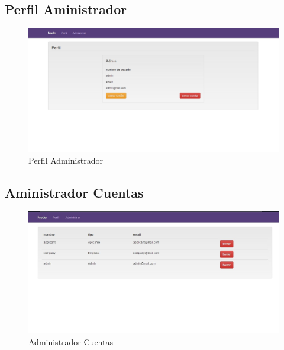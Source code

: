 \newpage 
\subsection{Perfil Aministrador}
\begin{figure}[h]
\begin{center}
	\includegraphics[scale=1.5]{./resources/vistas/perfilAdmin.jpg}
	\caption{Perfil Administrador}
	\label{fig:cue}
\end{center}
\end{figure}


\newpage 
\subsection{Aministrador Cuentas}
\begin{figure}[h]
\begin{center}
	\includegraphics[scale=0.40]{./resources/vistas/admin.jpg}
	\caption{Administrador Cuentas}
	\label{fig:cue}
\end{center}
\end{figure}
